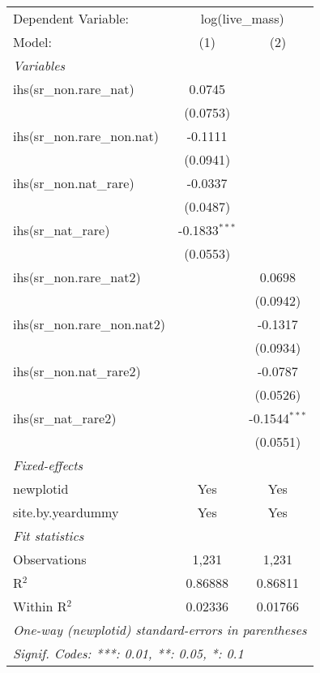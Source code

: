 \begin{tabular}{lcc}
\tabularnewline\midrule\midrule
Dependent Variable:&\multicolumn{2}{c}{log(live\_mass)}\\
Model:&(1) & (2)\\
\midrule \emph{Variables}&   &  \\
ihs(sr\_non.rare\_nat)&0.0745 &   \\
  &(0.0753) &   \\
ihs(sr\_non.rare\_non.nat)&-0.1111 &   \\
  &(0.0941) &   \\
ihs(sr\_non.nat\_rare)&-0.0337 &   \\
  &(0.0487) &   \\
ihs(sr\_nat\_rare)&-0.1833$^{***}$ &   \\
  &(0.0553) &   \\
ihs(sr\_non.rare\_nat2)&   & 0.0698\\
  &   & (0.0942)\\
ihs(sr\_non.rare\_non.nat2)&   & -0.1317\\
  &   & (0.0934)\\
ihs(sr\_non.nat\_rare2)&   & -0.0787\\
  &   & (0.0526)\\
ihs(sr\_nat\_rare2)&   & -0.1544$^{***}$\\
  &   & (0.0551)\\
\midrule \emph{Fixed-effects}&   &  \\
newplotid & Yes & Yes\\
site.by.yeardummy & Yes & Yes\\
\midrule \emph{Fit statistics}&  & \\
Observations & 1,231&1,231\\
R$^2$ & 0.86888&0.86811\\
Within R$^2$ & 0.02336&0.01766\\
\midrule\midrule\multicolumn{3}{l}{\emph{One-way (newplotid) standard-errors in parentheses}}\\
\multicolumn{3}{l}{\emph{Signif. Codes: ***: 0.01, **: 0.05, *: 0.1}}\\
\end{tabular}


